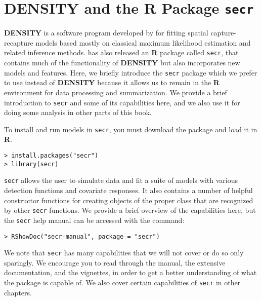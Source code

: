 \begin{comment}
\subsection{
Exercises
}

{\flushleft
1.	Compute the 95\% confidence interval for wolverine density,
somehow. Comment on the practical implication of this level of precision.
}

{\flushleft
2.	Compute the AIC of this model and modify \mbox{\tt intlik3}
 to consider alternative link functions (at least one additional) and
 compare the  AIC of the different models and the estimates. Comment. 
}
\end{comment}


\section{DENSITY and the R Package \mbox{\tt secr} }
\label{mle.sec.secr}

{\bf DENSITY} is a software program developed by \citet{efford:2004}
for fitting spatial capture-recapture models based mostly on classical
maximum likelihood estimation and related inference methods.
\citet{efford:2011} has also released an {\bf R} package called
\mbox{\tt secr}, that contains much of the functionality of {\bf
  DENSITY} but also incorporates new models and features.  Here, we
briefly introduce the \mbox{\tt secr} package which we prefer to use
instead of {\bf DENSITY} because it allows us to remain in the {\bf R}
environment for data processing and summarization. We provide a brief
introduction to \mbox{\tt secr} and some of its capabilities here, and
we also use it for doing some analysis in other parts of this book.

To install
and run models in \mbox{\tt secr}, you must download the package and
load it in
{\bf R}.
\begin{verbatim}
> install.packages("secr")
> library(secr)
\end{verbatim}
\mbox{\tt secr} allows the user to simulate data and fit a suite of models with
various detection functions and covariate responses. It also contains
a number of helpful constructor functions for creating objects of the
proper class that are recognized by other \mbox{\tt secr}
functions. We provide a brief overview of the capabilities here, but
the \mbox{\tt secr} help manual can be accessed with the command:
\begin{verbatim}
> RShowDoc("secr-manual", package = "secr")
\end{verbatim}
We note that \mbox{\tt secr} has many capabilities that we will not
cover or do so only sparingly. We encourage you to read through the
manual, the extensive documentation, and the vignettes, in order
to get a better understanding of what the package is capable of. We
also cover certain capabilities of \mbox{\tt secr} in other
chapters. 

